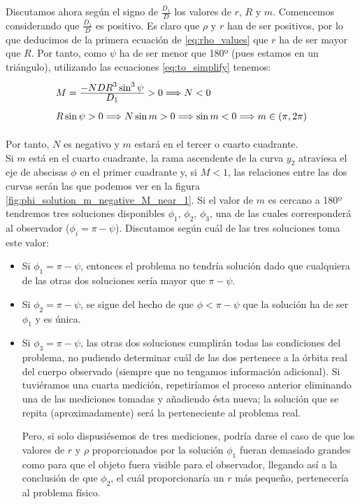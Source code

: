 \documentclass[11pt]{article}
\newcommand\ddfrac[2]{\frac{\displaystyle #1}{\displaystyle #2}}
\begin{document}
Discutamos ahora según el signo de $\frac{D_1}{D}$ los valores de $r$, $R$ y $m$. Comencemos considerando que $\frac{D_1}{D}$ es positivo. Es claro que $\rho$ y $r$ han de ser positivos, por lo que deducimos de la primera ecuación de \eqref{eq:rho_values} que $r$ ha de ser mayor que $R$. Por tanto, como $\psi$ ha de ser menor que 180º (pues estamos en un triángulo), utilizando las ecuaciones \eqref{eq:to_simplify} tenemos:
\[
\def\arraystretch{2}
\begin{array}{l}
M=\ddfrac{-NDR^3\sin^3{\psi}}{D_1}>0 \Longrightarrow N<0 \\
R\sin{\psi}>0 \Longrightarrow N\sin{m}>0 \Longrightarrow \sin{m}<0 \Longrightarrow m\in(\pi,2\pi)
\end{array}
\]

Por tanto, $N$ es negativo y $m$ estará en el tercer o cuarto cuadrante.\\

Si $m$ está en el cuarto cuadrante, la rama ascendente de la curva $y_2$ atraviesa el eje de abscisas $\phi$ en el primer cuadrante y, si $M<1$, las relaciones entre las dos curvas serán las que podemos ver en la figura \ref{fig:phi_solution_m_negative_M_near_1}. Si el valor de $m$ es cercano a 180º tendremos tres soluciones disponibles $\phi_1$, $\phi_2$, $\phi_3$, una de las cuales corresponderá al observador ($\phi_i=\pi-\psi$). Discutamos según cuál de las tres soluciones toma este valor:
\begin{itemize}
\item Si $\phi_1=\pi-\psi$, entonces el problema no tendría solución dado que cualquiera de las otras dos soluciones sería mayor que $\pi-\psi$.
\item Si $\phi_2=\pi-\psi$, se sigue del hecho de que $\phi<\pi-\psi$ que la solución ha de ser $\phi_1$ y es única.
\item Si $\phi_3=\pi-\psi$, las otras dos soluciones cumplirán todas las condiciones del problema, no pudiendo determinar cuál de las dos pertenece a la órbita real del cuerpo observado (siempre que no tengamos información adicional). Si tuviéramos una cuarta medición, repetiríamos el proceso anterior eliminando una de las mediciones tomadas y añadiendo ésta nueva; la solución que se repita (aproximadamente) será la perteneciente al problema real.

Pero, si solo dispusiésemos de tres mediciones, podría darse el caso de que los valores de $r$ y $\rho$ proporcionados por la solución $\phi_1$ fueran demasiado grandes como para que el objeto fuera visible para el observador, llegando así a la conclusión de que $\phi_2$, el cuál proporcionaría un $r$ más pequeño, pertenecería al problema físico.
\end{itemize} 
\end{document}
